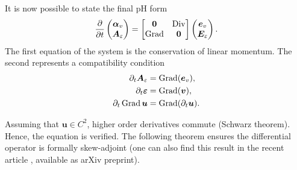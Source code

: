 It is now possible to state the final pH form
\begin{equation}
\diffp{}{t}
\begin{pmatrix}
\bm{\alpha}_v \\
\bm{A}_\varepsilon
\end{pmatrix} = 
\begin{bmatrix}
\bm{0} & \Div \\
\Grad & \bm{0} \\
\end{bmatrix}
\begin{pmatrix}
\bm{e}_v \\
\bm{E}_\varepsilon
\end{pmatrix}.
\end{equation}
The first equation of the system is the conservation of linear momentum. The second represents a compatibility condition 
\begin{equation}\label{eq:compderElas}
\begin{aligned}
\partial_t {\bm{A}_\varepsilon} &= \operatorname*{Grad}(\bm{e}_v), \\
\partial_t\bm{\varepsilon} &= \operatorname*{Grad}(\bm{v}), \\
\partial_t \operatorname*{Grad} \bm{u} &= \operatorname*{Grad}(\partial_t \bm{u}). \\
\end{aligned}
\end{equation}

Assuming that $\bm{u} \in C^2$, higher order derivatives commute (Schwarz theorem). Hence, the equation is verified. The following theorem ensures the differential operator is formally skew-adjoint (one can also find this result in the recent article \cite[Lemma 3.3]{pauly2020elasticity}, available as arXiv preprint). 

